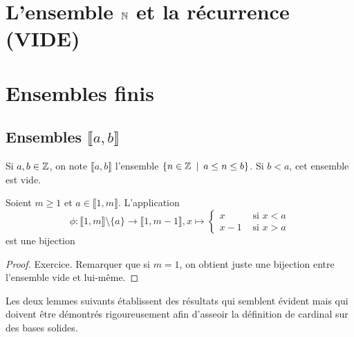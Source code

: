 
\section{L'ensemble $\mathbb{N}$ et la récurrence (VIDE)}

\section{Ensembles finis}

\subsection{Ensembles $\llbracket a,b\rrbracket$}

Si $a, b\in \mathbb{Z}$, on note $\llbracket a,b\rrbracket$ l'ensemble $\{n\in \mathbb{Z}\:\mid\: a\leq n \leq b\}$. Si $b<a$, cet ensemble est vide.

\begin{lemme} Soient $m\geq 1$ et $a\in \llbracket 1,m\rrbracket$. L'application 
\[
\phi : \llbracket 1,m\rrbracket \setminus \{a\} \to \llbracket 1,m-1\rrbracket, 
x\mapsto \begin{cases}x & \text{ si }x<a\\x-1 & \text{ si }x>a\end{cases}
\]
est une bijection
\end{lemme}
\begin{proof} Exercice. Remarquer que si $m=1$, on obtient juste une bijection entre l'ensemble vide et lui-même.
\end{proof}


Les deux lemmes suivants établissent des résultats qui semblent \og évident\fg{} mais qui doivent être démontrés rigoureusement afin d'asseoir la définition de cardinal sur des bases solides.


